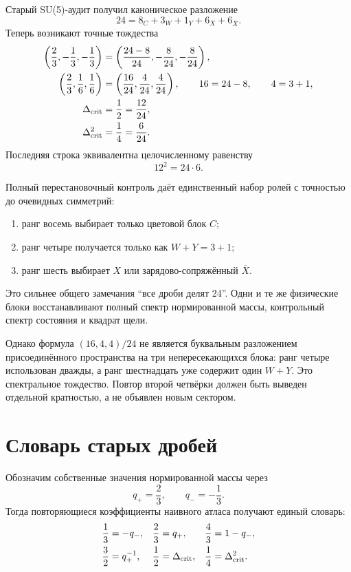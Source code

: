 Старый SU(5)-аудит получил каноническое разложение
\begin{equation}
 24=8_C+3_W+1_Y+6_X+6_{\overline X}.
 \label{eq:v6-atlas-su5-ranks}
\end{equation}
Теперь возникают точные тождества
\begin{align}
 \left(\frac23,-\frac13,-\frac13\right)
 &=\left(\frac{24-8}{24},-\frac8{24},-\frac8{24}\right),
 \label{eq:v6-atlas-Q-rank-identity}\\
 \left(\frac23,\frac16,\frac16\right)
 &=\left(\frac{16}{24},\frac4{24},\frac4{24}\right),
 \qquad 16=24-8,\qquad 4=3+1,
 \label{eq:v6-atlas-R-rank-identity}\\
 \Delta_{\rm crit}&=\frac12=\frac{12}{24},\\
 \Delta_{\rm crit}^2&=\frac14=\frac6{24}.
 \label{eq:v6-atlas-gap-rank-identity}
\end{align}
Последняя строка эквивалентна целочисленному равенству
\begin{equation}
 12^2=24\cdot6.
\end{equation}

Полный перестановочный контроль даёт единственный набор ролей с точностью
до очевидных симметрий:
\begin{enumerate}
 \item ранг восемь выбирает только цветовой блок $C$;
 \item ранг четыре получается только как $W+Y=3+1$;
 \item ранг шесть выбирает $X$ или зарядово-сопряжённый $\overline X$.
\end{enumerate}

Это сильнее общего замечания ``все дроби делят 24''. Одни и те же
физические блоки восстанавливают полный спектр нормированной массы,
контрольный спектр состояния и квадрат щели.

Однако формула $(16,4,4)/24$ не является буквальным разложением
присоединённого пространства на три непересекающихся блока: ранг четыре
использован дважды, а ранг шестнадцать уже содержит один $W+Y$. Это
спектральное тождество. Повтор второй четвёрки должен быть выведен
отдельной кратностью, а не объявлен новым сектором.

\section{Словарь старых дробей}

Обозначим собственные значения нормированной массы через
\begin{equation}
 q_+=\frac23,
 \qquad q_-=-\frac13.
\end{equation}
Тогда повторяющиеся коэффициенты наивного атласа получают единый словарь:
\begin{align}
 \frac13&=-q_-,&
 \frac23&=q_+,&
 \frac43&=1-q_-,\\
 \frac32&=q_+^{-1},&
 \frac12&=\Delta_{\rm crit},&
 \frac14&=\Delta_{\rm crit}^2.
 \label{eq:v6-atlas-fraction-dictionary}
\end{align}


